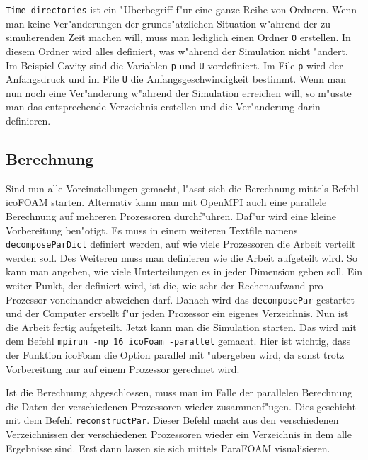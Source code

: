 \begin{refsection}
\texttt{Time directories} ist ein "Uberbegriff f"ur eine ganze Reihe von
Ordnern. Wenn man keine Ver"anderungen der grunds"atzlichen Situation
w"ahrend der zu simulierenden Zeit machen will, muss man lediglich einen
Ordner  \texttt{0} erstellen. In diesem Ordner wird alles definiert,
was w"ahrend der Simulation nicht "andert. Im Beispiel Cavity sind die
Variablen  \texttt{p} und  \texttt{U} vordefiniert.
Im File \texttt{p} wird der
Anfangsdruck und im File \texttt{U} die Anfangsgeschwindigkeit bestimmt.
Wenn man
nun noch eine Ver"anderung w"ahrend der Simulation erreichen will, so
m"usste man das entsprechende Verzeichnis erstellen und die Ver"anderung
darin definieren.

\subsection{Berechnung}
Sind nun alle Voreinstellungen gemacht, l"asst sich die Berechnung
mittels Befehl icoFOAM starten. Alternativ kann man mit OpenMPI auch
eine parallele Berechnung auf mehreren Prozessoren durchf"uhren. Daf"ur
wird eine kleine Vorbereitung ben"otigt. Es muss in einem weiteren
Textfile namens \texttt{decomposeParDict} definiert werden, auf wie
viele Prozessoren die Arbeit verteilt werden soll. Des Weiteren muss
man definieren wie die Arbeit aufgeteilt wird. So kann man angeben, wie
viele Unterteilungen es in jeder Dimension geben soll. Ein weiter Punkt,
der definiert wird, ist die, wie sehr der Rechenaufwand pro Prozessor
voneinander abweichen darf. Danach wird das \texttt{decomposePar}
gestartet und der Computer erstellt f"ur jeden Prozessor ein eigenes
Verzeichnis. Nun ist die Arbeit fertig aufgeteilt. Jetzt kann man
die Simulation starten. Das wird mit dem Befehl \texttt{mpirun -np 16
icoFoam -parallel} gemacht. Hier ist wichtig, dass der Funktion icoFoam
die Option parallel mit "ubergeben wird, da sonst trotz Vorbereitung
nur auf einem Prozessor gerechnet wird.

Ist die Berechnung abgeschlossen, muss man im Falle
der parallelen Berechnung die Daten der verschiedenen
Prozessoren wieder zusammenf"ugen. Dies geschieht mit dem Befehl
\texttt{reconstructPar}. Dieser Befehl macht aus den verschiedenen
Verzeichnissen der verschiedenen Prozessoren wieder ein Verzeichnis in
dem alle Ergebnisse sind. Erst dann lassen sie sich mittels ParaFOAM
visualisieren.


\end{refsection}
